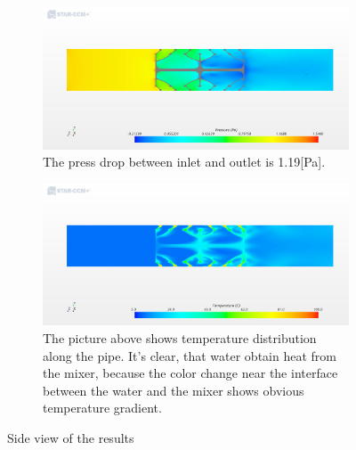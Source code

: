 \documentclass[journal,article,submit,moreauthors,pdftex]{Definitions/mdpi}
\begin{document}
\begin{figure}
\begin{center}
\centering
\begin{subfigure}[b]{1.0\textwidth}
\includegraphics[width=\linewidth]{./docu_pictures/result1.png}
\caption*{The press drop between inlet and outlet is 1.19[Pa]. \\ \vspace{1cm}}
\end{subfigure}
\begin{subfigure}[b]{1.0\textwidth}
\includegraphics[width=\linewidth]{./docu_pictures/result2.png}
\caption*{The picture above shows temperature distribution along the pipe. It's clear, that water obtain heat from the mixer, because the color change near the interface between the water and the mixer shows obvious temperature gradient. \\ \vspace{1cm}}
\end{subfigure}
\end{center}
\caption{Side view of the results}
\label{vertical-result-pictures}
\end{figure}
\end{document}

